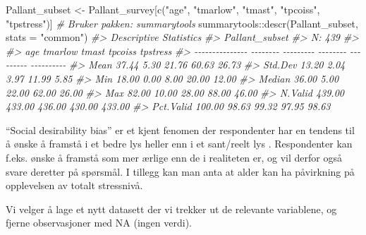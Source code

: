 \documentclass[
]{article}
\newenvironment{Shaded}{\begin{snugshade}}{\end{snugshade}}
\newcommand{\AttributeTok}[1]{\textcolor[rgb]{0.77,0.63,0.00}{#1}}
\newcommand{\CommentTok}[1]{\textcolor[rgb]{0.56,0.35,0.01}{\textit{#1}}}
\newcommand{\FunctionTok}[1]{\textcolor[rgb]{0.00,0.00,0.00}{#1}}
\newcommand{\NormalTok}[1]{#1}
\newcommand{\OtherTok}[1]{\textcolor[rgb]{0.56,0.35,0.01}{#1}}
\newcommand{\SpecialCharTok}[1]{\textcolor[rgb]{0.00,0.00,0.00}{#1}}
\newcommand{\StringTok}[1]{\textcolor[rgb]{0.31,0.60,0.02}{#1}}
\begin{document}
\begin{Shaded}
\begin{Highlighting}[]
\NormalTok{Pallant\_subset }\OtherTok{\textless{}{-}}\NormalTok{ Pallant\_survey[}\FunctionTok{c}\NormalTok{(}\StringTok{"age"}\NormalTok{, }\StringTok{"tmarlow"}\NormalTok{, }\StringTok{"tmast"}\NormalTok{, }\StringTok{"tpcoiss"}\NormalTok{, }\StringTok{"tpstress"}\NormalTok{)]}
\CommentTok{\# Bruker pakken: summarytools}
\NormalTok{summarytools}\SpecialCharTok{::}\FunctionTok{descr}\NormalTok{(Pallant\_subset, }\AttributeTok{stats =} \StringTok{"common"}\NormalTok{)}
\CommentTok{\#\textgreater{} Descriptive Statistics  }
\CommentTok{\#\textgreater{} Pallant\_subset  }
\CommentTok{\#\textgreater{} N: 439  }
\CommentTok{\#\textgreater{} }
\CommentTok{\#\textgreater{}                      age   tmarlow    tmast   tpcoiss   tpstress}
\CommentTok{\#\textgreater{} {-}{-}{-}{-}{-}{-}{-}{-}{-}{-}{-}{-}{-}{-}{-} {-}{-}{-}{-}{-}{-}{-}{-} {-}{-}{-}{-}{-}{-}{-}{-}{-} {-}{-}{-}{-}{-}{-}{-}{-} {-}{-}{-}{-}{-}{-}{-}{-}{-} {-}{-}{-}{-}{-}{-}{-}{-}{-}{-}}
\CommentTok{\#\textgreater{}            Mean    37.44      5.30    21.76     60.63      26.73}
\CommentTok{\#\textgreater{}         Std.Dev    13.20      2.04     3.97     11.99       5.85}
\CommentTok{\#\textgreater{}             Min    18.00      0.00     8.00     20.00      12.00}
\CommentTok{\#\textgreater{}          Median    36.00      5.00    22.00     62.00      26.00}
\CommentTok{\#\textgreater{}             Max    82.00     10.00    28.00     88.00      46.00}
\CommentTok{\#\textgreater{}         N.Valid   439.00    433.00   436.00    430.00     433.00}
\CommentTok{\#\textgreater{}       Pct.Valid   100.00     98.63    99.32     97.95      98.63}
\end{Highlighting}
\end{Shaded}

``Social desirability bias'' er et kjent fenomen der respondenter har en tendens til å ønske å framstå i et bedre lys heller enn i et sant/reelt lys \citep{preissTestingLevelSocial2015}. Respondenter kan f.eks. ønske å framstå som mer ærlige enn de i realiteten er, og vil derfor også svare deretter på spørsmål. I tillegg kan man anta at alder kan ha påvirkning på opplevelsen av totalt stressnivå.

Vi velger å lage et nytt datasett der vi trekker ut de relevante variablene, og fjerne observasjoner med NA (ingen verdi).
\end{document}
